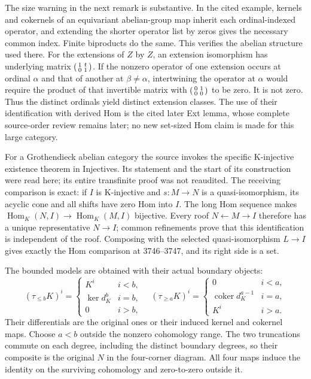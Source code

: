 The size warning in the next remark is substantive. In the cited example,\allowbreak{} kernels and cokernels of an equivariant abelian-group map inherit each ordinal-indexed operator,\allowbreak{} and extending the shorter operator list by zeros gives the necessary common index. Finite biproducts do the same. This verifies the abelian structure used there. For the extensions of \(Z\) by \(Z\),\allowbreak{} an extension isomorphism has underlying matrix \(\begin{psmallmatrix}1&t\\0&1\end{psmallmatrix}\). If the nonzero operator of one extension occurs at ordinal \(\alpha\) and that of another at \(\beta\ne\alpha\),\allowbreak{} intertwining the operator at \(\alpha\) would require the product of that invertible matrix with \(\begin{psmallmatrix}0&1\\0&0\end{psmallmatrix}\) to be zero. It is not zero. Thus the distinct ordinals yield distinct extension classes. The use of their identification with derived Hom is the cited later Ext lemma,\allowbreak{} whose complete source-order review remains later; no new set-sized Hom claim is made for this large category.

For a Grothendieck abelian category the source invokes the specific K-injective existence theorem in Injectives. Its statement and the start of its construction were read here; its entire transfinite proof was not reaudited. The receiving comparison is exact:\allowbreak{} if \(I\) is K-injective and \(s:M\to N\) is a quasi-isomorphism,\allowbreak{} its acyclic cone and all shifts have zero Hom into \(I\). The long Hom sequence makes \(\operatorname{Hom}_K(N,I)\to\operatorname{Hom}_K(M,I)\) bijective. Every roof \(N\leftarrow M\to I\) therefore has a unique representative \(N\to I\); common refinements prove that this identification is independent of the roof. Composing with the selected quasi-isomorphism \(L\to I\) gives exactly the Hom comparison at 3746–\allowbreak{}3747,\allowbreak{} and its right side is a set.

The bounded models are obtained with their actual boundary objects:\allowbreak{} \[
(\tau_{\leq b}K)^i=
\begin{cases}K^i&i<b,\\\ker d_K^b&i=b,\\0&i>b,\end{cases}
\quad
(\tau_{\geq a}K)^i=
\begin{cases}0&i<a,\\\operatorname{coker}d_K^{a-1}&i=a,\\K^i&i>a.
\end{cases}
\] Their differentials are the original ones or their induced kernel and cokernel maps. Choose \(a<b\) outside the nonzero cohomology range. The two truncations commute on each degree,\allowbreak{} including the distinct boundary degrees,\allowbreak{} so their composite is the original \(N\) in the four-corner diagram. All four maps induce the identity on the surviving cohomology and zero-to-zero outside it.

